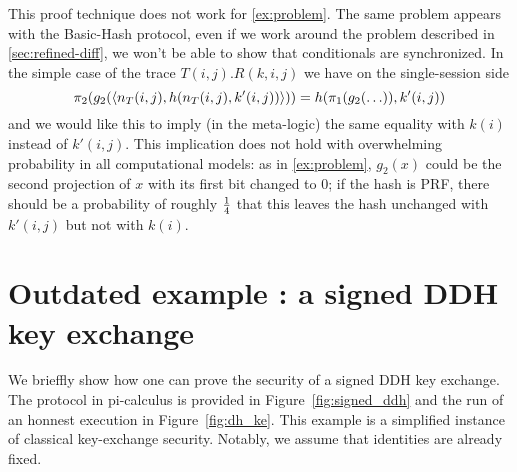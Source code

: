 \begin{example} \label{ex:indep}
  This proof technique does not work for \cref{ex:problem}.
  The same problem appears with the Basic-Hash protocol, even if we work around
the problem described in \cref{sec:refined-diff}, we won't be able to show
that conditionals are synchronized.  In the simple case of the trace
$T(i,j).R(k,i,j)$ we have
on the single-session side
$$\pi_2(g_2(\langle n_T(i,j),h(n_T(i,j),k'(i,j)) \rangle)) =
 h(\pi_1(g_2(\ldots)),k'(i,j))$$
and we would like this to imply (in the meta-logic)
the same equality with $k(i)$ instead of $k'(i,j)$.
This implication does not hold with overwhelming probability in all
computational models: as in \cref{ex:problem}, $g_2(x)$ could be the second
projection of $x$ with its first bit changed to $0$; if the hash is PRF,
there should be a probability of roughly $1 \over 4$ that this leaves
the hash unchanged with $k'(i,j)$ but not with $k(i)$.
\end{example}

\section{Outdated example : a signed DDH key exchange}

We brieffly show how one can prove the security of a signed DDH key exchange. The protocol in pi-calculus is provided in Figure~\ref{fig:signed_ddh} and the run of an honnest execution in Figure~\ref{fig:dh_ke}. This example is a simplified instance of classical key-exchange security. Notably, we assume that identities are already fixed.

